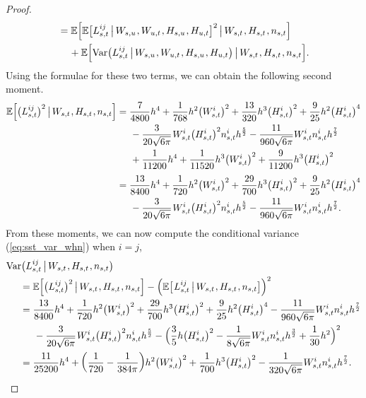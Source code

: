 \documentclass[sn-mathphys-num]{sn-jnl}%
\newcommand{\E}{\mathbb{E}}
\newcommand{\m}{\hspace{0.25mm}}
\newcommand{\mm}{\hspace{5mm}}
\newcommand{\mmm}{\hspace{10mm}}
\newcommand{\var}{\mathrm{Var}}
\begin{document}
\begin{proof}
\begin{align*}
& = \E\Big[\E\big[L_{s,t}^{ij}\,\big|\, W_{s,u}\m, W_{u,t}\m, H_{s,u}\m, H_{u,t}\big]^2\,\big|\, W_{s,t}\m, H_{s,t}\m, n_{s,t}\Big]\\
&\hspace{4mm} + \E\Big[\var\big(L_{s,t}^{ij}\,\big|\, W_{s,u}\m, W_{u,t}\m, H_{s,u}\m, H_{u,t}\big)\,\big|\, W_{s,t}\m, H_{s,t}\m, n_{s,t}\Big].
\end{align*}
Using the formulae for these two terms, we can obtain the following second moment.
\begin{align*}
\E\Big[\big(L_{s,t}^{ij}\big)^2\,\big|\, W_{s,t}\m, H_{s,t}\m, n_{s,t}\Big] & = \frac{7}{4800} h^4 + \frac{1}{768}h^2\big(W_{s,t}^i\big)^2 + \frac{13}{320}h^3 \big(H_{s,t}^i\big)^2 + \frac{9}{25}h^2\big(H_{s,t}^i\big)^4\\
&\mm - \frac{3}{20\sqrt{6\pi}}\m W_{s,t}^i\big(H_{s,t}^i\big)^2 n_{s,t}^i h^\frac{5}{2} - \frac{11}{960\sqrt{6\pi}} W_{s,t}^i n_{s,t}^i h^\frac{7}{2}\\
&\mm + \frac{1}{11200}h^4 + \frac{1}{11520}h^3 \big(W_{s,t}^i\big)^2 + \frac{9}{11200}h^3 \big(H_{s,t}^i\big)^2\\[3pt]
& = \frac{13}{8400} h^4 + \frac{1}{720}h^2\big(W_{s,t}^i\big)^2 + \frac{29}{700}h^3 \big(H_{s,t}^i\big)^2 + \frac{9}{25}h^2\big(H_{s,t}^i\big)^4 \\
&\mm  - \frac{3}{20\sqrt{6\pi}}\m W_{s,t}^i\big(H_{s,t}^i\big)^2 n_{s,t}^i h^\frac{5}{2} - \frac{11}{960\sqrt{6\pi}} W_{s,t}^i n_{s,t}^i h^\frac{7}{2}.
\end{align*}
From these moments, we can now compute the conditional variance (\ref{eq:sst_var_whn}) when $i=j$,
\begin{align*}
&\var\big(L_{s,t}^{ij}\,\big|\, W_{s,t}\m, H_{s,t}\m, n_{s,t}\big)\\
&\mm = \E\Big[\big(L_{s,t}^{ij}\big)^2\,\big|\, W_{s,t}\m, H_{s,t}\m, n_{s,t}\Big] - \Big(\E\big[\m L_{s,t}^{ij}\,\big|\, W_{s,t}\m, H_{s,t}\m, n_{s,t}\big]\Big)^2\\
&\mm = \frac{13}{8400} h^4 + \frac{1}{720}h^2\big(W_{s,t}^i\big)^2 + \frac{29}{700}h^3 \big(H_{s,t}^i\big)^2 + \frac{9}{25}h^2\big(H_{s,t}^i\big)^4 - \frac{11}{960\sqrt{6\pi}} W_{s,t}^i n_{s,t}^i h^\frac{7}{2}\\
&\mmm  - \frac{3}{20\sqrt{6\pi}}\m W_{s,t}^i\big(H_{s,t}^i\big)^2 n_{s,t}^i h^\frac{5}{2} - \Big(\frac{3}{5}h \big(H_{s,t}^i\big)^2 - \frac{1}{8\sqrt{6\pi}}W_{s,t}^i n_{s,t}^i h^\frac{3}{2} + \frac{1}{30}h^2\Big)^2\\
&\mm = \frac{11}{25200} h^4  + \bigg(\frac{1}{720} - \frac{1}{384\pi}\bigg)h^2\big(W_{s,t}^i\big)^2 + \frac{1}{700}h^3 \big(H_{s,t}^i\big)^2 - \frac{1}{320\sqrt{6\pi}} W_{s,t}^i n_{s,t}^i h^\frac{7}{2}.

\end{align*}
\end{proof}
\end{document}
